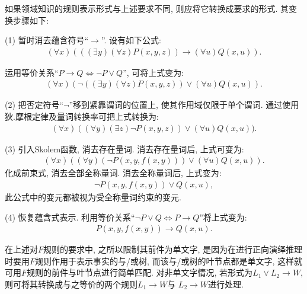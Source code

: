 如果领域知识的规则表示形式与上述要求不同, 则应将它转换成要求的形式. 其变换步骤如下:

(1) 暂时消去蕴含符号“$\rightarrow$”. 设有如下公式:
\begin{align}
  (\forall x)(((\exists  y) (\forall  z)P(x, y,z))\rightarrow (\forall u)Q(x, u)).
\end{align}

运用等价关系“$P\rightarrow Q\Leftrightarrow \neg P\vee Q$”, 可将上式变为:
\begin{align}
    (\forall x)(\neg ((\exists   y) (\forall z)P(x, y,z))\vee (\forall u)Q(x, u)).
\end{align}

(2) 把否定符号“$\neg$”移到紧靠谓词的位置上, 使其作用域仅限于单个谓词. 通过使用狄.摩根定律及量词转换率可把上式转换为:
\begin{align}
    (\forall  x)( (\forall y) (\exists  z)\neg P(x, y,z))\vee  (\forall u)Q(x, u)).
\end{align}

(3) 引入Skolem函数, 消去存在量词. 消去存在量词后, 上式可变为:
\begin{align}
    (\forall  x)( (\forall y) (\neg P(x, y,f(x,y)))\vee (\forall u)Q(x, u)).
\end{align}
化成前束式, 消去全部全称量词. 消去全称量词后, 上式变为:
\begin{align}
    \neg P(x, y,f(x,y))\vee Q(x, u),
\end{align}
此公式中的变元都被视为受全称量词约束的变元.

(4) 恢复蕴含式表示. 利用等价关系“$\neg P\vee Q\Leftrightarrow P\rightarrow Q$”将上式变为:
\begin{align}
   P(x, y,f(x,y))\rightarrow Q(x, u).
\end{align}

在上述对$F$规则的要求中, 之所以限制其前件为单文字, 是因为在进行正向演绎推理时要用$F$规则作用于表示事实的与/或树, 而该与/或树的叶节点都是单文字, 这样就可用$F$规则的前件与叶节点进行简单匹配.
对非单文字情况, 若形式为$L_1\vee L_2\rightarrow W$, 则可将其转换成与之等价的两个规则$L_1\rightarrow W$与 $L_2\rightarrow W$进行处理.

